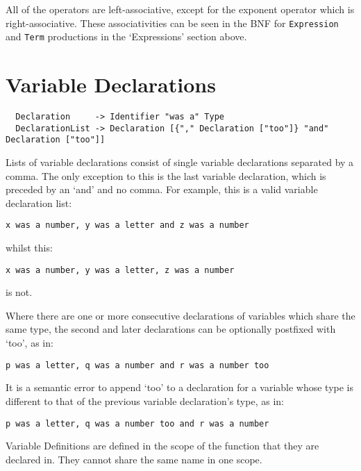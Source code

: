 \documentclass[a4wide, 11pt]{article}
\begin{document}
All of the operators are left-associative, except for the exponent operator which is right-associative. These associativities can be seen in the BNF for \texttt{Expression} and \texttt{Term} productions in the `Expressions' section above.

\section{Variable Declarations}

\begin{verbatim}
  Declaration     -> Identifier "was a" Type
  DeclarationList -> Declaration [{"," Declaration ["too"]} "and" Declaration ["too"]]
\end{verbatim}

Lists of variable declarations consist of single variable declarations separated by a comma. The only exception to this is the last variable declaration, which is preceded by an `and' and no comma. For example, this is a valid variable declaration list:

\begin{verbatim}
x was a number, y was a letter and z was a number
\end{verbatim}

whilst this:

\begin{verbatim}
x was a number, y was a letter, z was a number
\end{verbatim}

is not.

Where there are one or more consecutive declarations of variables which share the same type, the second and later declarations can be optionally postfixed with `too', as in:

\begin{verbatim}
p was a letter, q was a number and r was a number too
\end{verbatim}

It is a semantic error to append `too' to a declaration for a variable whose type is different to that of the previous variable declaration's type, as in:

\begin{verbatim}
p was a letter, q was a number too and r was a number
\end{verbatim}

Variable Definitions are defined in the scope of the function that they are declared in. They cannot share the same name in one scope.
\end{document}
